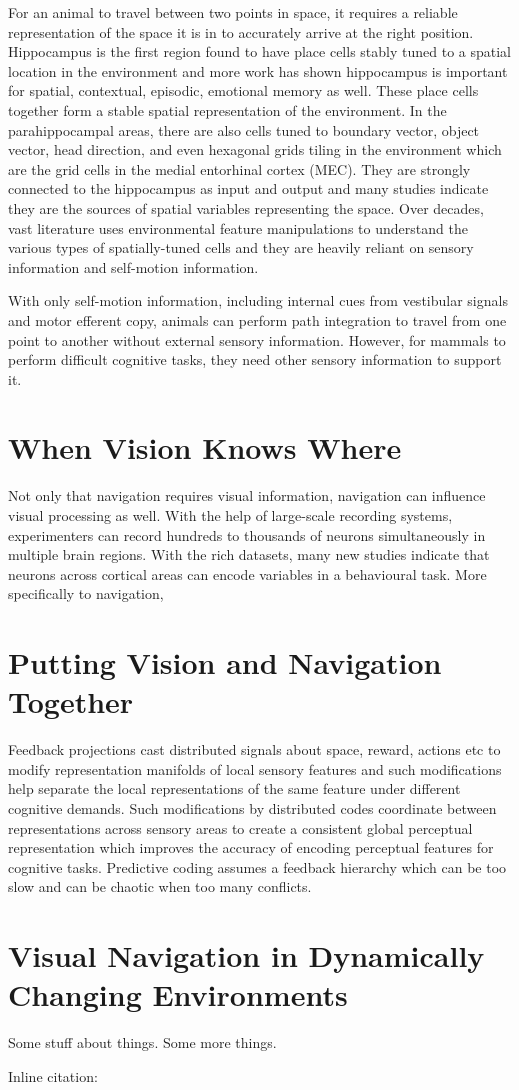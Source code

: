 For an animal to travel between two points in space, it requires a reliable representation of the space it is in to accurately arrive at the right position. Hippocampus is the first region found to have place cells stably tuned to a spatial location in the environment and more work has shown hippocampus is important for spatial, contextual, episodic, emotional memory as well. These place cells together form a stable spatial representation of the environment. In the parahippocampal areas, there are also cells tuned to boundary vector, object vector, head direction, and even hexagonal grids tiling in the environment which are the grid cells in the medial entorhinal cortex (MEC). They are strongly connected to the hippocampus as input and output and many studies indicate they are the sources of spatial variables representing the space. Over decades, vast literature uses environmental feature manipulations to understand the various types of spatially-tuned cells and they are heavily reliant on sensory information and self-motion information.

With only self-motion information, including internal cues from vestibular signals and motor efferent copy, animals can perform path integration to travel from one point to another without external sensory information. However, for mammals to perform difficult cognitive tasks, they need other sensory information to support it. 

\section{When Vision Knows Where}
Not only that navigation requires visual information, navigation can influence visual processing as well. With the help of large-scale recording systems, experimenters can record hundreds to thousands of neurons simultaneously in multiple brain regions. With the rich datasets, many new studies indicate that neurons across cortical areas can encode variables in a behavioural task. More specifically to navigation, 

\section{Putting Vision and Navigation Together}

Feedback projections cast distributed signals about space, reward, actions etc to modify representation manifolds of local sensory features and such modifications help separate the local representations of the same feature under different cognitive demands. Such modifications by distributed codes coordinate between representations across sensory areas to create a consistent global perceptual representation which improves the accuracy of encoding perceptual features for cognitive tasks. Predictive coding assumes a feedback hierarchy which can be too slow and can be chaotic when too many conflicts.
\section{Visual Navigation in Dynamically Changing Environments}

Some stuff about things.\cite{example-citation} Some more things. 

Inline citation: 

\blindtext

